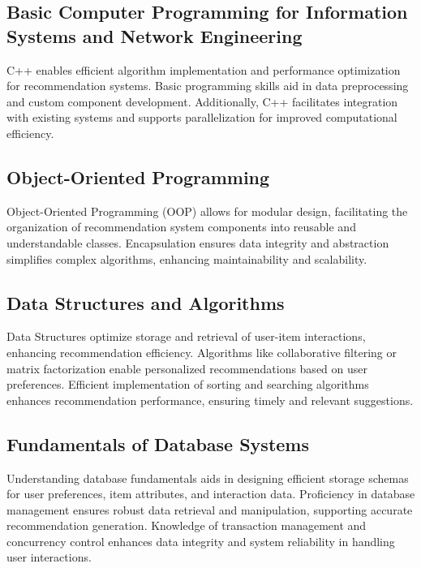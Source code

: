\subsection{Basic Computer Programming for Information Systems and Network Engineering}

C++ enables efficient algorithm implementation and performance optimization for 
recommendation systems. Basic programming skills aid in data preprocessing and custom 
component development. Additionally, C++ facilitates integration with existing systems 
and supports parallelization for improved computational efficiency.

\subsection{Object-Oriented Programming}

Object-Oriented Programming (OOP) allows for modular design, facilitating the organization 
of recommendation system components into reusable and understandable classes. 
Encapsulation ensures data integrity and abstraction simplifies complex algorithms, 
enhancing maintainability and scalability.

\subsection{Data Structures and Algorithms}

Data Structures optimize storage and retrieval of user-item interactions, enhancing 
recommendation efficiency. Algorithms like collaborative filtering or matrix factorization 
enable personalized recommendations based on user preferences. Efficient implementation of 
sorting and searching algorithms enhances recommendation performance, ensuring timely and 
relevant suggestions.

\subsection{Fundamentals of Database Systems}

Understanding database fundamentals aids in designing efficient storage schemas for user 
preferences, item attributes, and interaction data. Proficiency in database management 
ensures robust data retrieval and manipulation, supporting accurate recommendation generation. 
Knowledge of transaction management and concurrency control enhances data integrity and 
system reliability in handling user interactions.

